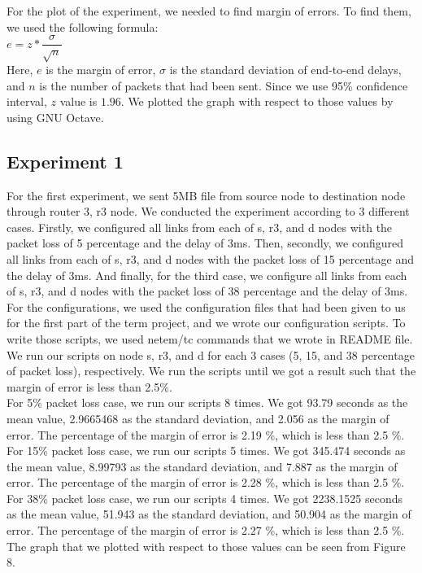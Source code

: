 \documentclass[conference]{IEEEtran}
\begin{document}
For the plot of the experiment, we needed to find margin of errors. To find them, we used the following formula: \\

$e = z * \dfrac{\sigma}{\sqrt{n}}$ \\

Here, $e$ is the margin of error, $\sigma$ is the standard deviation of end-to-end delays, and $n$ is the number of packets that had been sent. Since we use 95\% confidence interval, $z$ value is $1.96$. We plotted the graph with respect to those values by using GNU Octave. \\

\subsection{Experiment 1}
For the first experiment, we sent 5MB file from source node to destination node through router 3, r3 node. We conducted the experiment according to 3 different cases. Firstly, we configured all links from each of s, r3, and d nodes with the packet loss of 5 percentage and the delay of 3ms. Then, secondly, we configured all links from each of s, r3, and d nodes with the packet loss of 15 percentage and the delay of 3ms. And finally, for the third case, we configure all links from each of s, r3, and d nodes with the packet loss of 38 percentage and the delay of 3ms. For the configurations, we used the configuration files that had been given to us for the first part of the term project, and we wrote our configuration scripts. To write those scripts, we used netem/tc commands that we wrote in README file. \\

We run our scripts on node s, r3, and d for each 3 cases (5, 15, and 38 percentage of packet loss), respectively. We run the scripts until we got a result such that the margin of error is less than 2.5\%. \\

For 5\% packet loss case, we run our scripts 8 times. We got 93.79 seconds as the mean value, 2.9665468 as the standard deviation, and 2.056 as the margin of error. The percentage of the margin of error is 2.19 \%, which is less than 2.5 \%. For 15\% packet loss case, we run our scripts 5 times. We got 345.474 seconds as the mean value, 8.99793 as the standard deviation, and 7.887 as the margin of error. The percentage of the margin of error is 2.28 \%, which is less than 2.5 \%. For 38\% packet loss case, we run our scripts 4 times. We got 2238.1525 seconds as the mean value, 51.943 as the standard deviation, and 50.904 as the margin of error. The percentage of the margin of error is 2.27 \%, which is less than 2.5 \%. The graph that we plotted with respect to those values can be seen from Figure 8. \\
\end{document}
